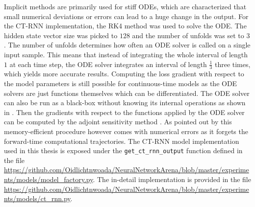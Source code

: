 \documentclass[draft,final]{vutinfth} %
\begin{document}
    Implicit methods are primarily used for stiff ODEs, which are characterized that small numerical deviations or errors can lead to a huge change in the output.
    For the CT-RNN implementation, the RK4 method was used to solve the ODE. The hidden state vector size was picked to $128$ and the number of unfolds was set to $3$.
    The number of unfolds determines how often an ODE solver is called on a single input sample. This means that instead of integrating the whole interval of length $1$ at each time step, the ODE solver integrates an interval of length $\frac{1}{3}$ three times, which yields more accurate results.
    Computing the loss gradient with respect to the model parameters is still possible for continuous-time models as the ODE solvers are just functions themselves which can be differentiated.
    The ODE solver can also be run as a black-box without knowing its internal operations as shown in \cite{NeuralODEs}.
    Then the gradients with respect to the functions applied by the ODE solver can be computed by the adjoint sensitivity method \cite{AdjointSensitivityMethod}.
    As pointed out by \cite[p. 3]{LTCNetworks} this memory-efficient procedure however comes with numerical errors as it forgets the forward-time computational trajectories.
    The CT-RNN model implementation used in this thesis is exposed under the \texttt{get\_ct\_rnn\_output} function defined in the file \url{https://github.com/Oidlichtnwoada/NeuralNetworkArena/blob/master/experiments/models/model_factory.py}.
    The in-detail implementation is provided in the file \url{https://github.com/Oidlichtnwoada/NeuralNetworkArena/blob/master/experiments/models/ct_rnn.py}.
\end{document}
